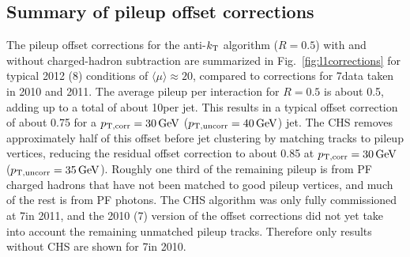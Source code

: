 \documentclass[11pt,twoside,a4paper,cmspaper,final,collab]{cms-tdr}
\begin{document}
\subsection{Summary of pileup offset corrections}\label{sec:l1summary}

The pileup offset corrections for the anti-$k_{\mathrm{T}}$ algorithm ($R=0.5$) with and without charged-hadron subtraction are summarized in Fig.~\ref{fig:l1corrections} for typical 2012 (8\TeV) conditions of $\langle\mu\rangle\approx20$, compared to corrections for 7\TeV data taken in 2010 and 2011.
The average pileup per interaction for $R=0.5$ is about 0.5\GeV,
adding up to a total of about 10\GeV per jet. This results in a typical offset correction of about 0.75 for a $p_{\mathrm{T},\rm corr}=30\,\text{Ge\hspace{-.08em}V}$ ($p_{\mathrm{T},\rm uncorr}=40\,\text{Ge\hspace{-.08em}V}$) jet. The CHS removes approximately half of this offset before jet clustering by matching tracks to pileup vertices, reducing the residual offset correction to about 0.85 at $p_{\mathrm{T},\rm corr}=30\,\text{Ge\hspace{-.08em}V}$ ($p_{\mathrm{T},\rm uncorr}=35\,\text{Ge\hspace{-.08em}V}$). Roughly one third of the remaining pileup is from PF charged hadrons that have not been matched to good pileup vertices, and much of the rest is from PF photons.
The CHS algorithm was only fully commissioned at 7\TeV in 2011, and the 2010 (7\TeV) version of the offset corrections did not yet take into account the remaining unmatched pileup tracks. Therefore only results without CHS are shown for 7\TeV in 2010.
\end{document}
